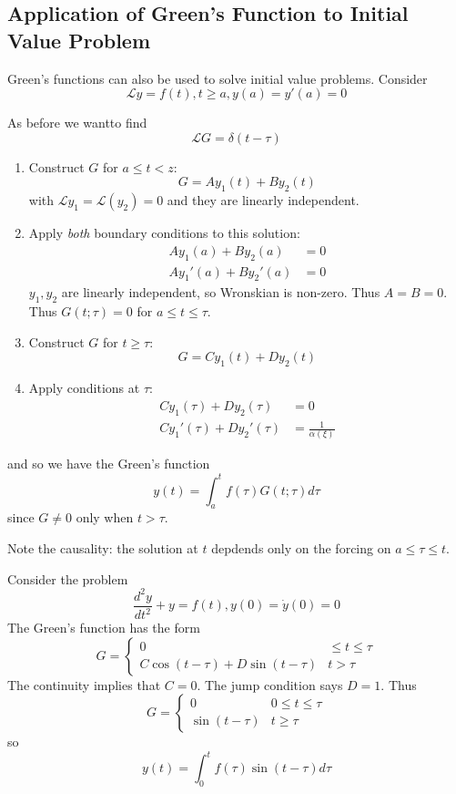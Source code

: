\documentclass[a4paper]{article}
\renewcommand*{\L}{\mathcal{L}}
\begin{document}
\subsection{Application of Green's Function to Initial Value Problem}

Green's functions can also be used to solve initial value problems. Consider
\[
  \L y = f(t), t \geq a, y(a) = y'(a) = 0
\]

As before we wantto find
\[
  \L G = \delta(t- \tau)
\]

\begin{enumerate}
\item Construct \(G\) for \(a \leq t < z\):
  \[
    G = A y_1(t) + B y_2(t)
  \]
  with \(\L y_1 = \L(y_2) = 0\) and they are linearly independent.
\item Apply \emph{both} boundary conditions to this solution:
  \begin{align*}
    A y_1(a) + B y_2(a) &= 0 \\
    A y_1'(a) + B y_2'(a) &= 0
  \end{align*}
  \(y_1, y_2\) are linearly independent, so Wronskian is non-zero. Thus \(A = B = 0\). Thus \(G(t; \tau) = 0\) for \(a \leq t \leq \tau\).
\item Construct \(G\) for \(t \geq \tau\):
  \[
    G = C y_1(t) + D y_2(t)
  \]
\item Apply conditions at \(\tau\):
  \begin{align*}
    C y_1(\tau) + D y_2(\tau) &= 0 \\
    C y_1'(\tau) + D y_2'(\tau) &= \frac{1}{\alpha(\xi)}
  \end{align*}
\end{enumerate}
and so we have the Green's function
\[
  y(t) = \int_{a}^{t} f(\tau) G(t; \tau) d\tau
\]
since \(G \neq 0\) only when \(t > \tau\).

Note the causality: the solution at \(t\) depdends only on the forcing on \(a \leq \tau \leq t\).

\begin{eg}
  Consider the problem
  \[
    \frac{d^2y}{dt^2} + y = f(t), y(0) = \dot y(0) = 0
  \]
  The Green's function has the form
  \[
    G =
    \begin{cases}
      0 & \leq t \leq \tau \\
      C \cos(t - \tau) + D \sin(t - \tau) & t > \tau
    \end{cases}
  \]
  The continuity implies that \(C = 0\). The jump condition says \(D = 1\). Thus
  \[
    G =
    \begin{cases}
      0 & 0 \leq t \leq \tau \\
      \sin(t - \tau) & t \geq \tau
    \end{cases}
    \]
    so
    \[
      y(t) = \int_{0}^{t} f(\tau) \sin(t - \tau) d\tau
    \]
\end{eg}
\end{document}
